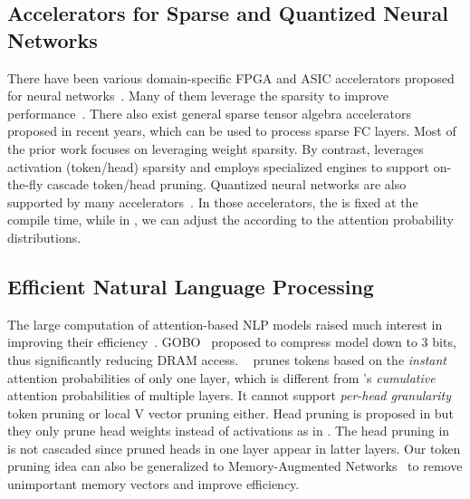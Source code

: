 \subsection{Accelerators for Sparse and Quantized Neural Networks}
There have been various domain-specific FPGA and ASIC accelerators proposed for neural networks~\cite{mubarik2020printed, ramanathan2020look, song2020vr, kim2020duplo, liu2020duet, mo2020tfe, weng2020dsagen, vilim2020gorgon, ke2020recnmp, evans2020jpeg, gupta2020deeprecsys, zhao2020smartexchange, baek2020multi, ji2019fpsa}. Many of them leverage the sparsity to improve performance~\cite{10.1109/ISCA.2016.30, zhang2016cambricon, parashar2017scnn, zhou2018cambricon, yang2019sparse, gondimalla2019sparten, sharify2019laconic, cong2018understanding, yang2020procrustes, gong2020save, hwang2020centaur, qin2020sigma, delmas2019bit}. 
There also exist general sparse tensor algebra accelerators~\cite{chen2020tpspmv, hegde2019extensor, kanellopoulos2019smash, zhu2019sparse, kwon2019tensordimm, mahmoud2020tensordash, srivastava2020matraptor} proposed in recent years, which can be used to process sparse FC layers. 
Most of the prior work focuses on leveraging weight sparsity. By contrast, \name leverages activation (token/head) sparsity and employs specialized \topk engines to support on-the-fly cascade token/head pruning.
Quantized neural networks are also supported by many accelerators~\cite{lee2018unpu, judd2016stripes, sharify2018loom, umuroglu2018bismo, rzayev2017deeprecon, sharma2018bit, nvtensor, jouppi2017datacenter, song2020drq, zadeh2020gobo}. 
In those accelerators, the \bitwidth is fixed at the compile time, while in \name, we can adjust the \bitwidth according to the attention probability distributions.


\subsection{Efficient Natural Language Processing}
The large computation of attention-based NLP models raised much interest in improving their efficiency~\cite{hanruiwang2020hat, yan2020micronet, gu2018nonautoregressive, wang2020efficient}. GOBO~\cite{zadeh2020gobo} proposed to compress \bert model down to 3 bits, thus significantly reducing DRAM access. \powerbert~\cite{goyal2020power} prunes tokens based on the \emph{instant} attention probabilities of only one layer, which is different from \name's \emph{cumulative} attention probabilities of multiple layers. It cannot support \emph{per-head granularity} token pruning or local V vector pruning either. Head pruning is proposed in \cite{michel2019sixteen, voita2019analyzing} but they only prune head weights instead of activations as in \name. The head pruning in~\cite{voita2019analyzing} is not cascaded since pruned heads in one layer appear in latter layers. Our token pruning idea can also be generalized to Memory-Augmented Networks~\cite{NIPS2015_5846} to remove unimportant memory vectors and improve efficiency. 
